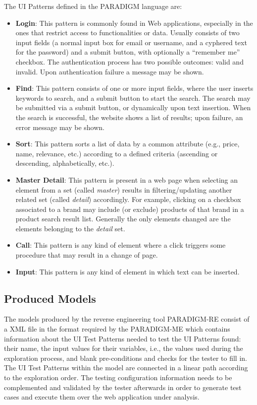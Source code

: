 The UI Patterns defined in the PARADIGM language are:
\begin{itemize}
\item[] \textbf{Login}: This pattern is commonly found in Web applications, especially in the ones that restrict access to functionalities or data. Usually consists of two input fields (a normal input box for email or username, and a cyphered text for the password) and a submit button, with optionally a ``remember me'' checkbox. The authentication process has two possible outcomes: valid and invalid. Upon authentication failure a message may be shown. 
\item[] \textbf{Find}: This pattern consists of one or more input fields, where the user inserts keywords to search, and a submit button to start the search. The search may be submitted via a submit button, or dynamically upon text insertion. When the search is successful, the website shows a list of results; upon failure, an error message may be shown.
\item[] \textbf{Sort}: This pattern sorts a list of data by a common attribute (e.g., price, name, relevance, etc.) according to a defined criteria (ascending or descending, alphabetically, etc.).
\item[] \textbf{Master Detail}: This pattern is present in a web page when selecting an element from a set (called \textit{master}) results in filtering/updating another related set (called \textit{detail}) accordingly. For example, clicking on a checkbox associated to a brand may include (or exclude) products of that brand in a product search result list. Generally the only elements changed are the elements belonging to the \textit{detail} set.
\item[] \textbf{Call}: This pattern is any kind of element where a click triggers some procedure that may result in a change of page.
\item[] \textbf{Input}: This pattern is any kind of element in which text can be inserted.
\end{itemize}

\subsection{Produced Models}

The models produced by the reverse engineering tool PARADIGM-RE consist of a XML file in the format required by the PARADIGM-ME which contains information about the UI Test Patterns needed to test the UI Patterns found: their name, the input values for their variables, i.e., the values used during the exploration process, and blank pre-conditions and checks for the tester to fill in. The UI Test Patterns within the model are connected in a linear path according to the exploration order. The testing configuration information needs to be complemented and validated by the tester afterwards in order to generate test cases and execute them over the web application under analysis.

